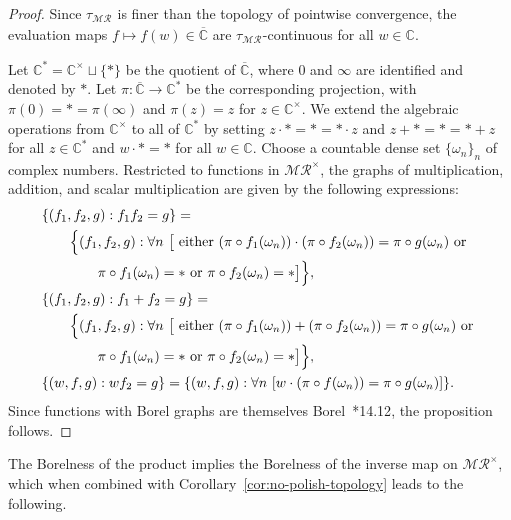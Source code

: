 \documentclass[12pt]{paper}
\numberwithin{equation}{section}
\theoremstyle{plain}
\theoremstyle{definition}
\newcommand{\C}{\mathbb{C}}
\newcommand{\Cbar}{\overline{\mathbb{C}}}
\newcommand{\merom}[1][]{\mathcal{MR}_{#1}}
\newcommand{\meromnz}{\merom^{\times}}
\begin{document}
\begin{proof}
  Since \(\tau_{\merom}\) is finer than the topology of pointwise convergence, the evaluation maps
  \( f \mapsto f(w) \in \Cbar\) are \(\tau_{\merom}\)-continuous for all \(w \in \C\).

  Let \(\C^{*} = \C^{\times} \sqcup \{*\}\) be the quotient of \(\Cbar\), where \(0\) and \(\infty\)
  are identified and denoted by \(*\).  Let \(\pi : \Cbar \to \C^{*}\) be the corresponding
  projection, with \(\pi(0) = * = \pi(\infty)\) and \(\pi(z) = z\) for \(z \in \C^{\times}\).  We
  extend the algebraic operations from \(\C^{\times}\) to all of \(\C^{*}\) by setting
  \( z \cdot * = * = * \cdot z \) and \(z + * = * = * + z\) for all \(z \in \C^{*}\) and
  \(w \cdot * = *\) for all \(w \in \C\).  Choose a countable dense set \(\{\omega_{n}\}_{n} \) of
  complex numbers. Restricted to functions in \(\meromnz\), the graphs of multiplication, addition,
  and scalar multiplication are given by the following expressions:
  \begin{displaymath}
    \begin{aligned}
      &\{(f_{1}, f_{2}, g) : f_{1}f_{2} = g\} = \\
      &\qquad \Bigl\{(f_{1}, f_{2}, g) : \forall n\ \bigl[\textrm{ either }
        (\pi \circ f_{1}(\omega_{n})) \cdot (\pi \circ f_{2}(\omega_{n})) =
        \pi \circ g(\omega_{n}) \textrm{ or } \\
      &\qquad \qquad \pi \circ f_{1}(\omega_{n}) = * \textrm{ or } \pi \circ f_{2}(\omega_{n}) = *
        \bigr]\Bigr\}, \\
      &\{(f_{1}, f_{2}, g) : f_{1} + f_{2} = g\} = \\
      &\qquad \Bigl\{(f_{1}, f_{2}, g) : \forall n\ \bigl[\textrm{ either }
        (\pi \circ f_{1}(\omega_{n}))
        + (\pi \circ f_{2}(\omega_{n})) = \pi \circ g(\omega_{n}) \textrm{ or } \\
      &\qquad \qquad \pi \circ f_{1}(\omega_{n}) = * \textrm{ or } \pi \circ f_{2}(\omega_{n}) = *
        \bigr]\Bigr\}, \\
      &\{(w, f, g) : wf_{2} = g\} =
        \{(w, f, g) : \forall n\ [ w \cdot (\pi \circ f(\omega_{n}))
        = \pi \circ g(\omega_{n})]\}.
    \end{aligned}
  \end{displaymath}
  Since functions with Borel graphs are themselves Borel~\cite{Kechris}*{14.12}, the proposition
  follows.
\end{proof}

The Borelness of the product implies the Borelness of the inverse map on \(\meromnz\), which when
combined with Corollary~\ref{cor:no-polish-topology} leads to the following.
\end{document}
